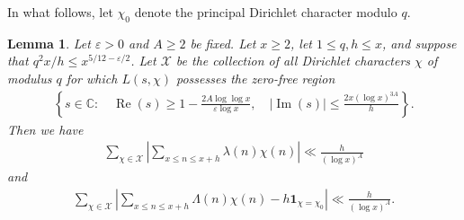 \documentclass[11pt,letterpaper]{amsart}
\renewcommand{\leq}{\leqslant}
\renewcommand{\geq}{\geqslant}
\newtheorem{corollary}[theorem]{Corollary}
\newtheorem{lemma}[theorem]{Lemma}
\theoremstyle{definition}
\numberwithin{equation}{section}
\renewcommand{\Re}{\real}
\renewcommand{\Im}{\im}
\DeclareMathOperator{\n}{N}
\DeclareMathOperator{\real}{Re}
\DeclareMathOperator{\im}{Im}
\newcommand{\0}{\mathbf{0}}
\begin{document}
In what follows, let $\chi_0$ denote the principal Dirichlet character modulo $q$.

\begin{lemma} 
\label{lem:oast}
Let $\varepsilon>0$ and $A\geq 2$ be fixed. Let $x\geq 2$, let $1\leq q,h\leq x$, and suppose that $q^2x/h\leq x^{5/12-\varepsilon/2}$. Let $\mathcal{X}$ be the collection of all Dirichlet characters $\chi$ of modulus $q$ for which $L(s,\chi)$ possesses the zero-free region
\begin{align}\label{eq:zerofree}
 \left\{s\in \mathbb{C}:\quad \Re(s)\geq 1-\frac{2A\log \log x}{\varepsilon\log x},\quad |\Im(s)|\leq \frac{2x(\log x)^{3A}}{h}\right\}.
\end{align}
Then we have
\begin{align*}
\sum_{\chi\in \mathcal{X}}\left|\sum_{x\leq n\leq x+h}\lambda(n)\chi(n)\right|\ll \frac{h}{(\log x)^{A}}
\end{align*}
and
\begin{align*}
\sum_{\chi\in \mathcal{X}}\left|\sum_{x\leq n\leq x+h}\Lambda(n)\chi(n)-h\mathbf{1}_{\chi=\chi_0}\right|\ll \frac{h}{(\log x)^{A}}.    
\end{align*}
\end{lemma}



\end{document}
